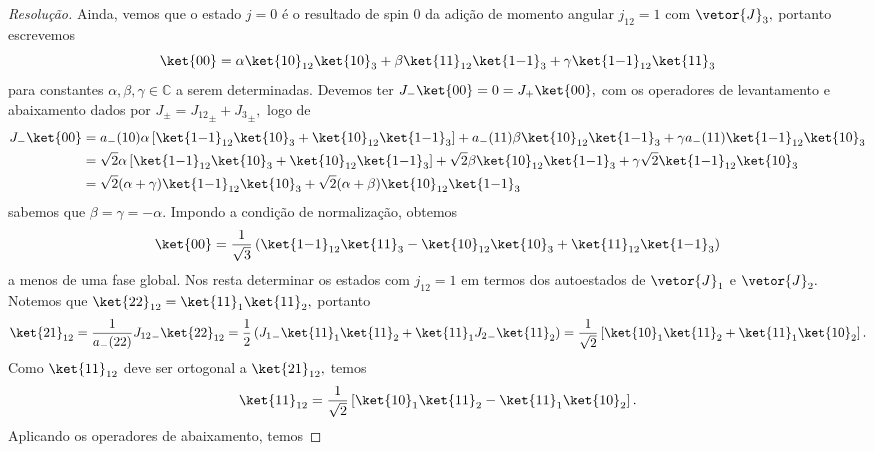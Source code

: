 \begin{proof}[Resolução]
    Ainda, vemos que o estado \(j = 0\) é o resultado de spin 0 da adição de momento angular \(j_{12} = 1\) com \(\vetor{J}_3,\) portanto escrevemos
    \begin{equation*}
        \ket{00} = \alpha \ket{10}_{12} \ket{10}_{3} + \beta \ket{11}_{12} \ket{1{-1}}_3 + \gamma \ket{1{-1}}_{12} \ket{11}_3
    \end{equation*}
    para constantes \(\alpha, \beta, \gamma \in \mathbb{C}\) a serem determinadas. Devemos ter \(J_- \ket{00} = 0 = J_+ \ket{00},\) com os operadores de levantamento e abaixamento dados por \(J_\pm = {J_{12}}_{\pm} + {J_3}_{\pm},\) logo de
    \begin{align*}
        J_- \ket{00} &= a_-(10)\alpha \left[\ket{1{-1}}_{12} \ket{10}_3 + \ket{10}_{12} \ket{1{-1}}_3\right] + a_-(11)\beta \ket{10}_{12} \ket{1{-1}}_3 + \gamma a_-(11)\ket{1{-1}}_{12} \ket{10}_3\\
                     &= \sqrt{2}\alpha \left[\ket{1{-1}}_{12} \ket{10}_3 + \ket{10}_{12} \ket{1{-1}}_3\right] + \sqrt{2}\beta \ket{10}_{12} \ket{1{-1}}_3 + \gamma \sqrt{2}\ket{1{-1}}_{12} \ket{10}_3\\
                     &= \sqrt{2}(\alpha + \gamma) \ket{1{-1}}_{12}\ket{10}_3 + \sqrt{2} (\alpha + \beta) \ket{10}_{12} \ket{1{-1}}_3
    \end{align*}
    sabemos que \(\beta = \gamma = -\alpha.\) Impondo a condição de normalização, obtemos
    \begin{equation*}
        \ket{00} = \frac{1}{\sqrt{3}} \left(\ket{1{-1}}_{12} \ket{11}_3 - \ket{10}_{12} \ket{10}_3 + \ket{11}_{12} \ket{1{-1}}_3\right)
    \end{equation*}
    a menos de uma fase global. Nos resta determinar os estados com \(j_{12} = 1\) em termos dos autoestados de \(\vetor{J}_1\) e \(\vetor{J}_2.\) Notemos que \(\ket{22}_{12} = \ket{11}_1 \ket{11}_2,\) portanto 
    \begin{equation*}
        \ket{21}_{12} = \frac1{a_-(22)} {J_{12}}_-\ket{22}_{12} = \frac12 \left({J_1}_-\ket{11}_1 \ket{11}_2 + \ket{11}_1 {J_2}_-\ket{11}_2\right) = \frac{1}{\sqrt{2}} \left[\ket{10}_1\ket{11}_2 + \ket{11}_1 \ket{10}_2\right].
    \end{equation*}
    Como \(\ket{11}_{12}\) deve ser ortogonal a \(\ket{21}_{12},\) temos
    \begin{equation*}
        \ket{11}_{12} = \frac1{\sqrt{2}}\left[\ket{10}_1\ket{11}_2 - \ket{11}_1 \ket{10}_2\right].
    \end{equation*}
    Aplicando os operadores de abaixamento, temos

\end{proof}
